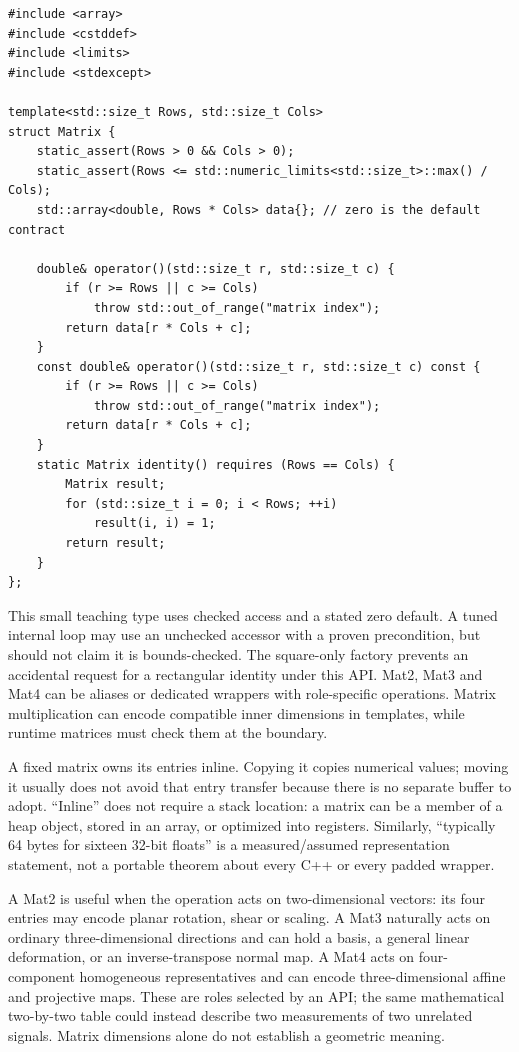 \begin{verbatim}
#include <array>
#include <cstddef>
#include <limits>
#include <stdexcept>

template<std::size_t Rows, std::size_t Cols>
struct Matrix {
    static_assert(Rows > 0 && Cols > 0);
    static_assert(Rows <= std::numeric_limits<std::size_t>::max() / Cols);
    std::array<double, Rows * Cols> data{}; // zero is the default contract

    double& operator()(std::size_t r, std::size_t c) {
        if (r >= Rows || c >= Cols)
            throw std::out_of_range("matrix index");
        return data[r * Cols + c];
    }
    const double& operator()(std::size_t r, std::size_t c) const {
        if (r >= Rows || c >= Cols)
            throw std::out_of_range("matrix index");
        return data[r * Cols + c];
    }
    static Matrix identity() requires (Rows == Cols) {
        Matrix result;
        for (std::size_t i = 0; i < Rows; ++i)
            result(i, i) = 1;
        return result;
    }
};
\end{verbatim}

This small teaching type uses checked access and a stated zero default. A tuned internal loop may use an unchecked accessor with a proven precondition, but should not claim it is bounds-checked. The square-only factory prevents an accidental request for a rectangular identity under this API. Mat2, Mat3 and Mat4 can be aliases or dedicated wrappers with role-specific operations. Matrix multiplication can encode compatible inner dimensions in templates, while runtime matrices must check them at the boundary.

A fixed matrix owns its entries inline. Copying it copies numerical values; moving it usually does not avoid that entry transfer because there is no separate buffer to adopt. ``Inline'' does not require a stack location: a matrix can be a member of a heap object, stored in an array, or optimized into registers. Similarly, ``typically 64 bytes for sixteen 32-bit floats'' is a measured/assumed representation statement, not a portable theorem about every C++  or every padded wrapper.

A Mat2 is useful when the operation acts on two-dimensional vectors: its four entries may encode planar rotation, shear or scaling. A Mat3 naturally acts on ordinary three-dimensional directions and can hold a basis, a general linear deformation, or an inverse-transpose normal map. A Mat4 acts on four-component homogeneous representatives and can encode three-dimensional affine and projective maps. These are roles selected by an API; the same mathematical two-by-two table could instead describe two measurements of two unrelated signals. Matrix dimensions alone do not establish a geometric meaning.

